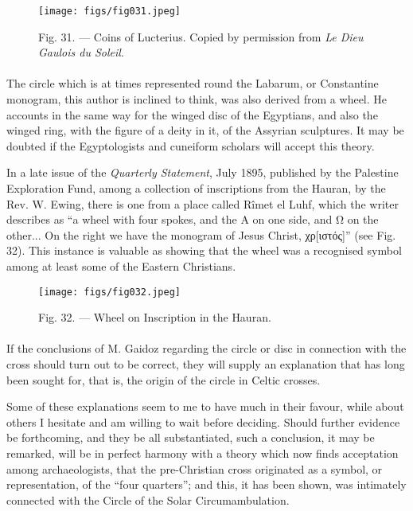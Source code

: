 \documentclass[a4paper, 11pt, oneside, polutonikogreek, english]{article}
\begin{document}
\begin{figure}[H]
\centering
\texttt{[image: figs/fig031.jpeg]}
\caption[Fig. 31. --- Coins of Lucterius.]{Fig. 31. --- Coins of Lucterius. Copied by permission from \emph{Le Dieu Gaulois du Soleil}.}
\end{figure}
\paragraph{}
The circle which is at times represented round the Labarum, or Constantine monogram, this author is inclined to think, was also derived from a wheel. He accounts in the same way for the winged disc of the Egyptians, and also the winged ring, with the figure of a deity in it, of the Assyrian sculptures. It may be doubted if the Egyptologists and cuneiform scholars will accept this theory.

In a late issue of the \emph{Quarterly Statement}, July 1895, published by the Palestine Exploration Fund, among a collection of inscriptions from the Hauran, by the Rev. W. Ewing, there is one from a place called Rîmet el Luhf, which the writer describes as ``a wheel with four spokes, and the Α on one side, and Ω on the other... On the right we have the monogram of Jesus Christ, χρ[ιστός]'' (see Fig. 32). This instance is valuable as showing that the wheel was a recognised symbol among at least some of the Eastern Christians.

\begin{figure}[H]
\centering
\texttt{[image: figs/fig032.jpeg]}
\caption{Fig. 32. --- Wheel on Inscription in the Hauran.}
\end{figure}
\paragraph{}
If the conclusions of M. Gaidoz regarding the circle or disc in connection with the cross should turn out to be correct, they will supply an explanation that has long been sought for, that is, the origin of the circle in Celtic crosses.

Some of these explanations seem to me to have much in their favour, while about others I hesitate and am willing to wait before deciding. Should further evidence be forthcoming, and they be all substantiated, such a conclusion, it may be remarked, will be in perfect harmony with a theory which now finds acceptation among archaeologists, that the pre-Christian cross originated as a symbol, or representation, of the ``four quarters''; and this, it has been shown, was intimately connected with the Circle of the Solar Circumambulation.
\clearpage
\end{document}

